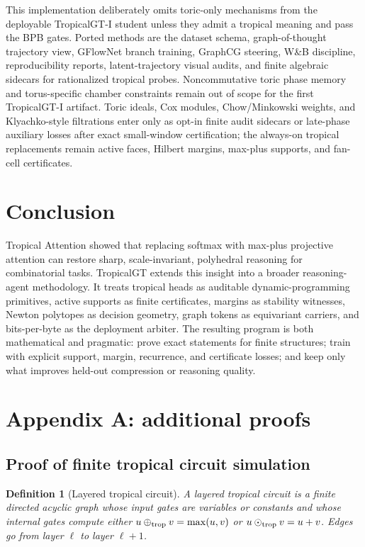 \documentclass[11pt]{article}
\newtheorem{definition}{Definition}[section]
\newcommand{\oplusT}{\oplus_{\rm trop}}
\newcommand{\odotT}{\odot_{\rm trop}}
\begin{document}
This implementation deliberately omits toric-only mechanisms from the deployable TropicalGT-I student unless they admit a tropical meaning and pass the BPB gates.  Ported methods are the dataset schema, graph-of-thought trajectory view, GFlowNet branch training, GraphCG steering, W\&B discipline, reproducibility reports, latent-trajectory visual audits, and finite algebraic sidecars for rationalized tropical probes.  Noncommutative toric phase memory and torus-specific chamber constraints remain out of scope for the first TropicalGT-I artifact.  Toric ideals, Cox modules, Chow/Minkowski weights, and Klyachko-style filtrations enter only as opt-in finite audit sidecars or late-phase auxiliary losses after exact small-window certification; the always-on tropical replacements remain active faces, Hilbert margins, max-plus supports, and fan-cell certificates.

\section{Conclusion}

Tropical Attention showed that replacing softmax with max-plus projective attention can restore sharp, scale-invariant, polyhedral reasoning for combinatorial tasks.  TropicalGT extends this insight into a broader reasoning-agent methodology.  It treats tropical heads as auditable dynamic-programming primitives, active supports as finite certificates, margins as stability witnesses, Newton polytopes as decision geometry, graph tokens as equivariant carriers, and bits-per-byte as the deployment arbiter.  The resulting program is both mathematical and pragmatic: prove exact statements for finite structures; train with explicit support, margin, recurrence, and certificate losses; and keep only what improves held-out compression or reasoning quality.

\newpage
\appendix
\section{Appendix A: additional proofs}

\subsection{Proof of finite tropical circuit simulation}

\begin{definition}[Layered tropical circuit]
A layered tropical circuit is a finite directed acyclic graph whose input gates are variables or constants and whose internal gates compute either \(u\oplusT v=\max(u,v)\) or \(u\odotT v=u+v\).  Edges go from layer \(\ell\) to layer \(\ell+1\).
\end{definition}
\end{document}
